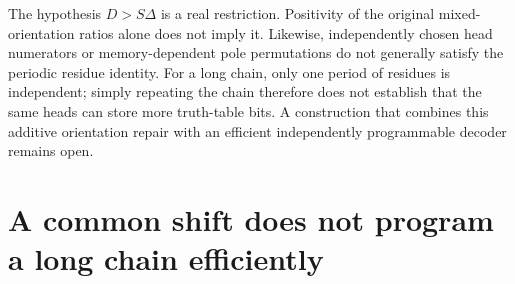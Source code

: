 \documentclass[11pt]{article}
\begin{document}
The hypothesis $D>S\Delta$ is a real restriction. Positivity of the
original mixed-orientation ratios alone does not imply it. Likewise,
independently chosen head numerators or memory-dependent pole
permutations do not generally satisfy the periodic residue identity.
For a long chain, only one period of residues is independent; simply
repeating the chain therefore does not establish that the same heads
can store more truth-table bits. A construction that combines this
additive orientation repair with an efficient independently
programmable decoder remains open.


\section{A common shift does not program a long chain efficiently}
\end{document}
